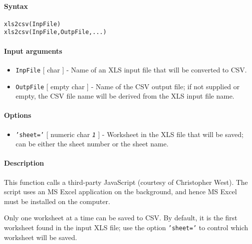 


	\paragraph{Syntax}\label{syntax}

\begin{verbatim}
xls2csv(InpFile)
xls2csv(InpFile,OutpFile,...)
\end{verbatim}

\paragraph{Input arguments}\label{input-arguments}

\begin{itemize}
\item
  \texttt{InpFile} {[} char {]} - Name of an XLS input file that will be
  converted to CSV.
\item
  \texttt{OutpFile} {[} empty \textbar{} char {]} - Name of the CSV
  output file; if not supplied or empty, the CSV file name will be
  derived from the XLS input file name.
\end{itemize}

\paragraph{Options}\label{options}

\begin{itemize}
\itemsep1pt\parskip0pt
\item
  \texttt{'sheet='} {[} numeric \textbar{} char \textbar{}
  \emph{\texttt{1}} {]} - Worksheet in the XLS file that will be saved;
  can be either the sheet number or the sheet name.
\end{itemize}

\paragraph{Description}\label{description}

This function calls a third-party JavaScript (courtesy of Christopher
West). The script uses an MS Excel application on the background, and
hence MS Excel must be installed on the computer.

Only one worksheet at a time can be saved to CSV. By default, it is the
first worksheet found in the input XLS file; use the option
\texttt{'sheet='} to control which worksheet will be saved.

